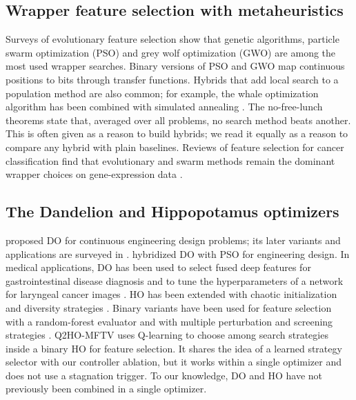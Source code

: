 \documentclass[pdflatex,sn-basic]{sn-jnl}
\begin{document}
\subsection{Wrapper feature selection with metaheuristics}
Surveys of evolutionary feature selection \citep{xue2016} show that genetic algorithms, particle swarm optimization (PSO) and grey wolf optimization (GWO) are among the most used wrapper searches. Binary versions of PSO \citep{kennedy1997} and GWO \citep{mirjalili2014gwo,emary2016bgwo} map continuous positions to bits through transfer functions. Hybrids that add local search to a population method are also common; for example, the whale optimization algorithm has been combined with simulated annealing \citep{mafarja2017}. The no-free-lunch theorems \citep{wolpert1997} state that, averaged over all problems, no search method beats another. This is often given as a reason to build hybrids; we read it equally as a reason to compare any hybrid with plain baselines. Reviews of feature selection for cancer classification find that evolutionary and swarm methods remain the dominant wrapper choices on gene-expression data \citep{ramadhani2025}.

\subsection{The Dandelion and Hippopotamus optimizers}
\citet{zhao2022do} proposed DO for continuous engineering design problems; its later variants and applications are surveyed in \citet{zhao2026review}. \citet{tang2024psodo} hybridized DO with PSO for engineering design. In medical applications, DO has been used to select fused deep features for gastrointestinal disease diagnosis \citep{kiziloluk2024} and to tune the hyperparameters of a network for laryngeal cancer images \citep{alzakari2024}. HO \citep{amiri2024ho} has been extended with chaotic initialization and diversity strategies \citep{pei2025}. Binary variants have been used for feature selection with a random-forest evaluator \citep{ardiyansa2025} and with multiple perturbation and screening strategies \citep{yuan2025msho}. Q2HO-MFTV \citep{hashjin2025q2ho} uses Q-learning to choose among search strategies inside a binary HO for feature selection. It shares the idea of a learned strategy selector with our controller ablation, but it works within a single optimizer and does not use a stagnation trigger. To our knowledge, DO and HO have not previously been combined in a single optimizer.
\end{document}

